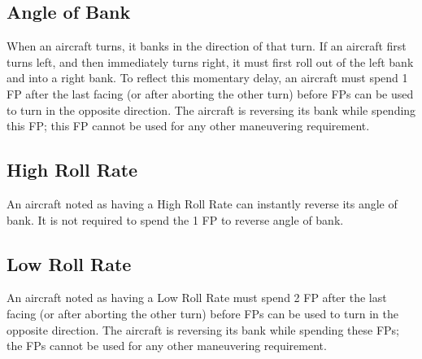 \begin{advancedrules}
    \section{Angle of Bank}
    \label{rule:direction-of-bank}

    When an aircraft turns, it banks in the direction of that turn.  If an aircraft first turns left, and then immediately turns right, it must first roll out of the left bank and into a right bank. To reflect this momentary delay, an aircraft must spend 1 FP after the last facing (or after aborting the other turn) before FPs can be used to turn in the opposite direction. The aircraft is reversing its bank while spending this FP; this FP cannot be used for any other maneuvering requirement.

    \subsection{High Roll Rate}
    An aircraft noted as having a High Roll Rate can instantly reverse its angle of bank. It is not required to spend the 1 FP to reverse angle of bank. 

    \subsection{Low Roll Rate}
    An aircraft noted as having a Low Roll Rate must spend 2 FP after the last facing (or after aborting the other turn) before FPs can be used to turn in the opposite direction. The aircraft is reversing its bank while spending these FPs; the FPs cannot be used for any other maneuvering requirement.




\end{advancedrules}
